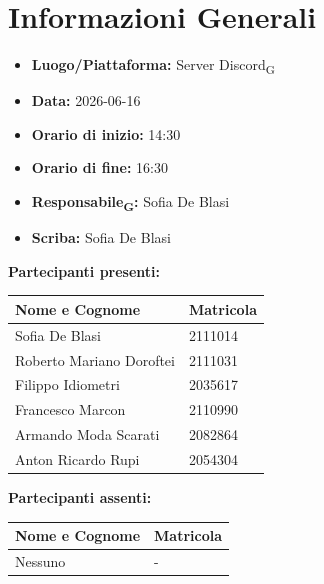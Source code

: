 \section{Informazioni Generali}
\begin{itemize}
    \item \textbf{Luogo/Piattaforma:} Server Discord\textsubscript{G}
    \item \textbf{Data:} 2026-06-16
    \item \textbf{Orario di inizio:} 14:30
    \item \textbf{Orario di fine:} 16:30
    \item \textbf{Responsabile\textsubscript{G}:} Sofia De Blasi
    \item \textbf{Scriba:} Sofia De Blasi
\end{itemize}

\vspace{0.5cm}
\textbf{Partecipanti presenti:}
\begin{table}[ht]
    \centering
    \renewcommand{\arraystretch}{1.2}
    \begin{tabularx}{\textwidth}{X l}
        \toprule
        \textbf{Nome e Cognome} & \textbf{Matricola} \\
        \midrule
        Sofia De Blasi & 2111014 \\
        Roberto Mariano Doroftei & 2111031 \\
        Filippo Idiometri & 2035617 \\
        Francesco Marcon & 2110990 \\
        Armando Moda Scarati & 2082864 \\
        Anton Ricardo Rupi & 2054304 \\
        \bottomrule
    \end{tabularx}
\end{table}

\vspace{0.5cm}
\textbf{Partecipanti assenti:}
\begin{table}[ht]
    \centering
    \renewcommand{\arraystretch}{1.2}
    \begin{tabularx}{\textwidth}{X l}
        \toprule
        \textbf{Nome e Cognome} & \textbf{Matricola} \\
        \midrule
        Nessuno & - \\
        \bottomrule
    \end{tabularx}
\end{table}

